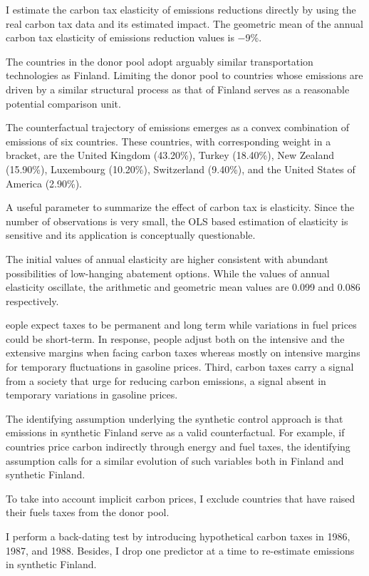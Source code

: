 \documentclass[
]{book}
\begin{document}
I estimate the carbon tax elasticity of
emissions reductions directly by using the real carbon tax data and its estimated impact.
The geometric mean of the annual carbon tax elasticity of emissions reduction values is
−9\%.

The countries in the donor pool adopt arguably similar transportation technologies as
Finland. Limiting the donor pool to countries whose emissions are driven by a similar
structural process as that of Finland serves as a reasonable potential comparison unit.

The
counterfactual trajectory of emissions emerges as a convex combination of emissions of
six countries. These countries, with corresponding weight in a bracket, are the United
Kingdom (43.20\%), Turkey (18.40\%), New Zealand (15.90\%), Luxembourg (10.20\%),
Switzerland (9.40\%), and the United States of America (2.90\%).

A useful parameter to summarize the effect of carbon tax is elasticity. Since the
number of observations is very small, the OLS based estimation of elasticity is sensitive
and its application is conceptually questionable.

The initial values of annual
elasticity are higher consistent with abundant possibilities of low-hanging abatement
options. While the values of annual elasticity oscillate, the arithmetic and geometric
mean values are 0.099 and 0.086 respectively.

eople expect taxes to be
permanent and long term while variations in fuel prices could be short-term. In
response, people adjust both on the intensive and the extensive margins when facing
carbon taxes whereas mostly on intensive margins for temporary fluctuations in gasoline
prices. Third, carbon taxes carry a signal from a society that urge for reducing carbon
emissions, a signal absent in temporary variations in gasoline prices.

The identifying assumption underlying the synthetic control approach is that emissions in
synthetic Finland serve as a valid counterfactual. For example, if countries price carbon
indirectly through energy and fuel taxes, the identifying assumption calls for a similar
evolution of such variables both in Finland and synthetic Finland.

To take into account implicit carbon prices, I exclude countries that have raised their
fuels taxes from the donor pool.

I perform a back-dating test by introducing
hypothetical carbon taxes in 1986, 1987, and 1988. Besides, I drop one predictor at a
time to re-estimate emissions in synthetic Finland.
\end{document}
